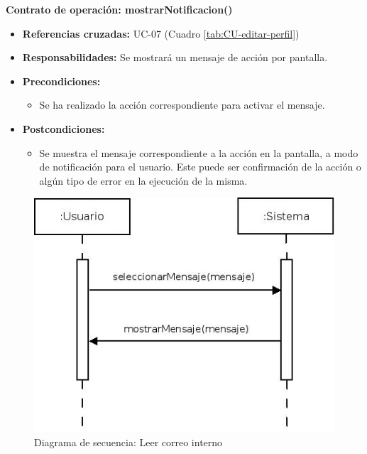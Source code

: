 \textbf{Contrato de operación: mostrarNotificacion()}
\begin{itemize}
\item \textbf{Referencias cruzadas:} UC-07 (Cuadro \ref{tab:CU-editar-perfil})
\item \textbf{Responsabilidades:} Se mostrará un mensaje de acción por pantalla.
\item \textbf{Precondiciones:} 
 \begin{itemize}
\item Se ha realizado la acción correspondiente para activar el mensaje.
\end {itemize}
\item \textbf{Postcondiciones:} 
 \begin{itemize}
\item Se muestra el mensaje correspondiente a la acción en la pantalla, a modo de notificación para el usuario. Este puede ser confirmación de la acción o algún tipo de error en la ejecución de la misma.
\end {itemize}
\end {itemize}


\vspace{7mm}
\dotfill
\vspace{7mm}

\begin{figure}[h!]
\centering
  \includegraphics[scale=.55]{img/secuencias/gestion-servicios-leer-correo.jpeg}
  \caption{Diagrama de secuencia: Leer correo interno}
  \label{fig:secuencia-gestion-servicios-leer-correo}
\end{figure}

